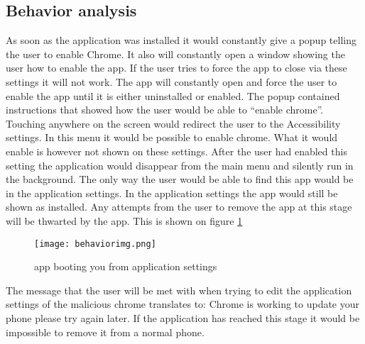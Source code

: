 \subsection{Behavior analysis}

As soon as the application was installed it would constantly give a popup telling the user to enable Chrome. 
It also will constantly open a window showing the user how to enable the app. 
If the user tries to force the app to close via these settings it will not work. 
The app will constantly open and force the user to enable the app until it is either uninstalled or enabled.
The popup contained instructions that showed how the user would be able to “enable chrome”. 
Touching anywhere on the screen would redirect the user to the Accessibility settings. 
In this menu it would be possible to enable chrome. What it would enable is however not shown on these settings. 
After the user had enabled this setting the application would disappear from the main menu and silently run in the background. 
The only way the user would be able to find this app would be in the application settings. 
In the application settings the app would still be shown as installed. 
Any attempts from the user to remove the app at this stage will be thwarted by the app.
This is shown on figure \ref{tim-appbehavior}

\begin{figure}[H]
    \centering
    \texttt{[image: behaviorimg.png]}
    \caption{app booting you from application settings}
    \label{tim-appbehavior}
\end{figure}

The message that the user will be met with when trying to edit the application settings of the malicious chrome translates to: 
Chrome is working to update your phone please try again later.
If the application has reached this stage it would be impossible to remove it from a normal phone.
